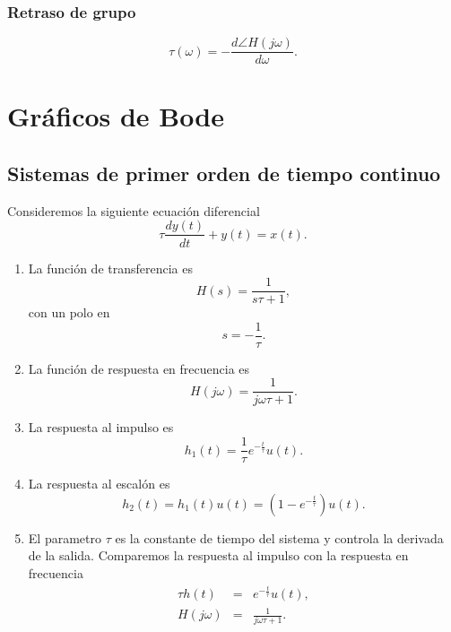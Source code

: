 \subsubsection{Retraso de grupo}
\begin{equation}
        \tau (\omega) = -\frac{d \angle H(j \omega)}{d\omega}.
\end{equation}

\section{Gr\'{a}ficos de Bode}

\subsection{Sistemas de primer orden de tiempo continuo}

Consideremos la siguiente ecuaci\'{o}n diferencial 
\begin{equation}
\tau \frac{dy\left( t\right) }{dt}+y\left( t\right) =x\left( t\right) .
\end{equation}

\begin{enumerate}
\item  La funci\'{o}n de transferencia es 
\begin{equation}
        H\left( s\right) =\frac{1}{s\tau +1},
\end{equation}
con un polo en 
\begin{equation}
        s=-\frac{1}{\tau }.
\end{equation}

\item  La funci\'{o}n de respuesta en frecuencia es 
\begin{equation}
H\left( j\omega \right) =\frac{1}{j\omega \tau +1}.
\end{equation}

\item  La respuesta al impulso es 
\begin{equation}
        h_{1}\left( t\right) =\frac{1}{\tau }e^{-\frac{t}{\tau }}u\left( t\right) .
\end{equation}

\item  La respuesta al escal\'{o}n es 
\begin{equation}
        h_{2}\left( t\right) =h_{1}\left( t\right)  u\left( t\right) =
                \left(1-e^{-\frac{t}{\tau }}\right) u\left( t\right) .
\end{equation}

\item  El parametro $\tau $ es la constante de tiempo del sistema y controla la derivada de la salida. 
Comparemos la respuesta al impulso con la respuesta en frecuencia 
\begin{eqnarray}
        \tau h\left( t\right) &=&e^{-\frac{t}{\tau }}u\left( t\right) , \\
        H\left( j\omega \right) &=&\frac{1}{j\omega \tau +1}.
\end{eqnarray}
\end{enumerate}

